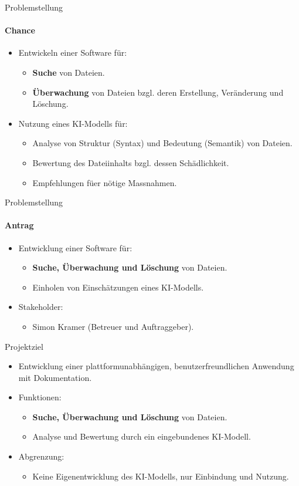 \documentclass[
	ngerman,%
	authorontitle=true,
	]{bfhbeamer}
\begin{document}
\begin{frame}{Problemstellung}
	\framesubtitle{Chance}
	\begin{itemize}

		\item Entwickeln einer Software f\"ur:
		\begin{itemize}
			\item \textbf{Suche} von Dateien.
			\item \textbf{\"Uberwachung} von Dateien bzgl. deren Erstellung, Ver\"anderung und L\"oschung.
		\end{itemize}
		\item Nutzung eines KI-Modells f\"ur:
		\begin{itemize}
			\item Analyse von Struktur (Syntax) und Bedeutung (Semantik) von Dateien.
			\item Bewertung des Dateiinhalts bzgl.
			dessen Schädlichkeit.
			\item Empfehlungen f\"uer n\"otige Massnahmen.
		\end{itemize}
	\end{itemize}
\end{frame}

\begin{frame}{Problemstellung}
	\framesubtitle{Antrag}
	\begin{itemize}
		\item Entwicklung einer Software f\"ur:
		\begin{itemize}
			\item \textbf{Suche, \"Uberwachung und L\"oschung} von Dateien.
			\item Einholen von Einsch\"atzungen eines KI-Modells.
		\end{itemize}
		\item Stakeholder:
		\begin{itemize}
			\item Simon Kramer (Betreuer und Auftraggeber).
		\end{itemize}
	\end{itemize}
\end{frame}

\begin{frame}{Projektziel}
	\begin{itemize}
		\item Entwicklung einer plattformunabh\"angigen, benutzerfreundlichen Anwendung mit Dokumentation.
		\item Funktionen:
		\begin{itemize}
			\item \textbf{Suche, \"Uberwachung und L\"oschung} von Dateien.
			\item Analyse und Bewertung durch ein eingebundenes KI-Modell.
		\end{itemize}
		\item Abgrenzung:
		\begin{itemize}
			\item Keine Eigenentwicklung des KI-Modells, nur Einbindung und Nutzung.
		\end{itemize}
	\end{itemize}
\end{frame}
\end{document}
